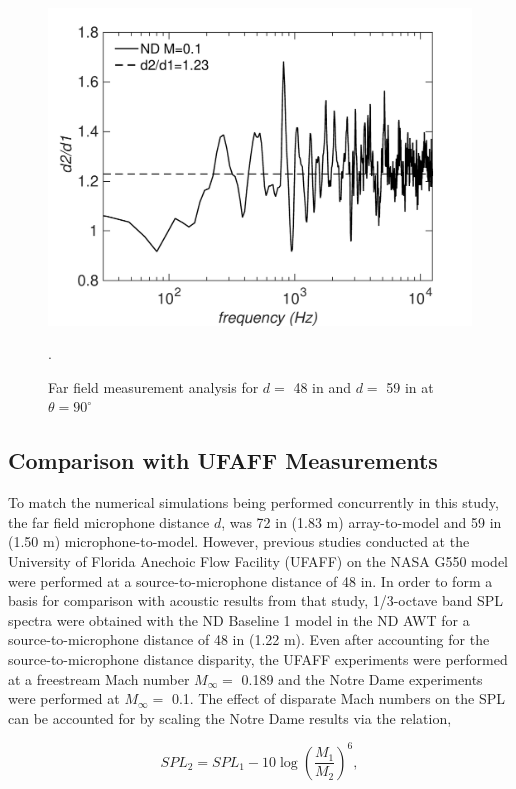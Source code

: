 \begin{figure}
	\begin{center}
		\centerline{\includegraphics[scale=0.7]{figures/mic_far}}
		\caption{Far field measurement analysis for $d =$ 48 in and $d =$ 59 in at $\theta = 90^\circ$}.
		\label{fig:far}
	\end{center}
\end{figure}

\subsection{Comparison with UFAFF Measurements}
To match the numerical simulations being performed concurrently in this study, the far field microphone distance $d$, was 72 in (1.83 m) array-to-model and 59 in (1.50 m) microphone-to-model. However, previous studies conducted at the University of Florida Anechoic Flow Facility (UFAFF) on the NASA G550 model were performed at a source-to-microphone distance of 48 in. In order to form a basis for comparison with acoustic results from that study, 1/3-octave band SPL spectra were obtained with the ND Baseline 1 model in the ND AWT for a source-to-microphone distance of 48 in (1.22 m). Even after accounting for the source-to-microphone distance disparity, the UFAFF experiments were performed at a freestream Mach number $M_\infty =$ 0.189 and the Notre Dame experiments were performed at $M_\infty=$ 0.1. The effect of disparate Mach numbers on the SPL can be accounted for by scaling the Notre Dame results via the relation, 

\begin{equation}
SPL_2 = SPL_1 - 10 \log \left( \frac{M_1}{M_2} \right)^6,
\end{equation}

